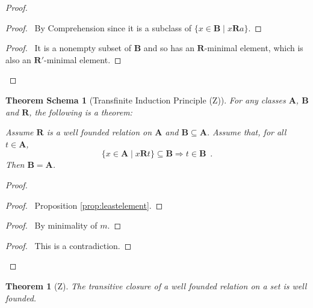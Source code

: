\documentclass{book}
\let\qed\relax
\newtheorem{thm}[ax]{Theorem}
\newtheorem{thms}[ax]{Theorem Schema}
\theoremstyle{definition}
\begin{document}
\begin{proof}
\pf
{}
\begin{proof}
	\pf\ By Comprehension since it is a subclass of $\{ x \in \mathbf{B} \mid x \mathbf{R} a \}$.
\end{proof}
\begin{proof}
	\pf\ It is a nonempty subset of $\mathbf{B}$ and so has an $\mathbf{R}$-minimal element, which is also an $\mathbf{R}'$-minimal element.
\end{proof}
\qed
\end{proof}

\begin{thms}[Transfinite Induction Principle (Z)]
For any classes $\mathbf{A}$, $\mathbf{B}$ and $\mathbf{R}$, the following is a theorem:

Assume $\mathbf{R}$ is a well founded relation on $\mathbf{A}$ and $\mathbf{B} \subseteq \mathbf{A}$. Assume that, for all $t \in \mathbf{A}$,
\[ \{ x \in \mathbf{A} \mid x \mathbf{R} t \} \subseteq \mathbf{B} \Rightarrow t \in \mathbf{B} \enspace . \]
Then $\mathbf{B} = \mathbf{A}$.
\end{thms}

\begin{proof}
\pf
{}
\begin{proof}
	\pf\ Proposition \ref{prop:leastelement}.
\end{proof}
\begin{proof}
	\pf\ By minimality of $m$.
\end{proof}
\qedstep
\begin{proof}
	\pf\ This is a contradiction.
\end{proof}
\qed
\end{proof}

\begin{thm}[Z]
The transitive closure of a well founded relation on a set is well founded.
\end{thm}
\end{document}
